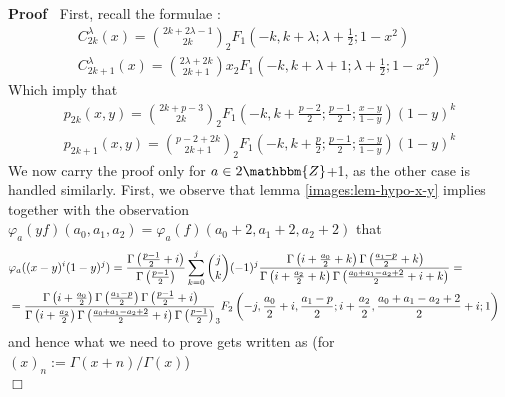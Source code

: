 \documentclass{article}
\newcommand{\assign}{:=}
\renewenvironment{proof}{\noindent\textbf{Proof\ }}{\hspace*{\fill}$\Box$\medskip}
\theoremstyle{remark}
\begin{document}
\begin{proof}
  First, recall the formulae {\cite[(20)-(23)]{gegenbauer}}:
  \begin{eqnarray}
    & C^{\lambda}_{2 k} (x) = \binom{2 k + 2 \lambda - 1}{2 k} _2 F_1 \left(
    - k, k + \lambda ; \lambda + \frac{1}{2} ; 1 - x^2 \right) &  \nonumber\\
    & C^{\lambda}_{2 k + 1} (x) = \binom{2 \lambda + 2 k}{2 k + 1} x_2 F_1
    \left( - k, k + \lambda + 1 ; \lambda + \frac{1}{2} ; 1 - x^2 \right) & 
    \nonumber
  \end{eqnarray}
  Which imply that
  \begin{eqnarray}
    & p_{2 k} (x, y) = \binom{2 k + p - 3}{2 k} _2 F_1 \left( - k, k +
    \frac{p - 2}{2} ; \frac{p - 1}{2} ; \frac{x - y}{1 - y} \right) (1 - y)^k
    &  \nonumber\\
    & p_{2 k + 1} (x, y) = \binom{p - 2 + 2 k}{2 k + 1} _2 F_1 \left( - k, k
    + \frac{p}{2} ; \frac{p - 1}{2} ; \frac{x - y}{1 - y} \right) (1 - y)^k & 
    \nonumber
  \end{eqnarray}
  We now carry the proof only for $a \in 2\mathbbm{Z}$+1, as the other case is
  handled similarly. First, we observe that lemma \ref{images:lem-hypo-x-y}
  implies together with the observation $\varphi_a (y f) (a_0, a_1, a_2) =
  \varphi_a (f) (a_0 + 2, a_1 + 2, a_2 + 2)$ that
  \begin{eqnarray}
    & \varphi_a ((x - y)^i (1 - y)^j) = \frac{\Gamma \left( \frac{p - 1}{2} +
    i \right)}{\Gamma \left( \frac{p - 1}{2} \right)} \sum_{k = 0}^j
    \binom{j}{k} (- 1)^j \frac{\hspace{0.17em} \Gamma \left( i + \frac{a_0}{2}
    + k \right) \Gamma \left( \frac{a_1 - p}{2} + k \right)}{\Gamma \left( i +
    \frac{a_2}{2} + k \right) \Gamma \left( \frac{a_0 + a_1 - a_2 + 2}{2} + i
    + k \right)} = &  \nonumber\\
    & = \frac{\hspace{0.17em} \Gamma \left( i + \frac{a_0}{2} \right) \Gamma
    \left( \frac{a_1 - p}{2} \right) \Gamma \left( \frac{p - 1}{2} + i
    \right)}{\Gamma \left( i + \frac{a_2}{2} \right) \Gamma \left( \frac{a_0 +
    a_1 - a_2 + 2}{2} + i \right) \Gamma \left( \frac{p - 1}{2} \right)} _3
    F_2 \left( - j, \frac{a_0}{2} + i, \frac{a_1 - p}{2} ; i + \frac{a_2}{2},
    \frac{a_0 + a_1 - a_2 + 2}{2} + i ; 1 \right) &  \nonumber
  \end{eqnarray}
  and hence what we need to prove gets written as (for $(x)_n \assign \Gamma
  (x + n) / \Gamma (x)$)
  \begin{eqnarray}

\end{eqnarray}
\end{proof}
\end{document}
